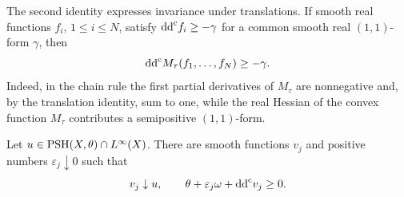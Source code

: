 The second identity expresses invariance under translations. If smooth real functions $f_i$, $1\leq i\leq N$, satisfy $\mathrm{dd}^{\mathrm{c}} f_i\geq-\gamma$ for a common smooth real $(1,1)$-form $\gamma$, then
\begin{equation}\label{eq:smooth-max-curvature}
 \mathrm{dd}^{\mathrm{c}} M_\tau(f_1,\ldots,f_N)\geq-\gamma.
\end{equation}
Indeed, in the chain rule the first partial derivatives of $M_\tau$ are nonnegative and, by the translation identity, sum to one, while the real Hessian of the convex function $M_\tau$ contributes a semipositive $(1,1)$-form.

\begin{proposition}\label{prop:bounded-almost-regularization}
Let $u\in\mathrm{PSH}(X,\theta)\cap L^\infty(X)$. There are smooth functions $v_j$ and positive numbers $\varepsilon_j\downarrow0$ such that
\[
 v_j\downarrow u,\qquad
 \theta+\varepsilon_j\omega+\mathrm{dd}^{\mathrm{c}} v_j\geq0.
\]
\end{proposition}
